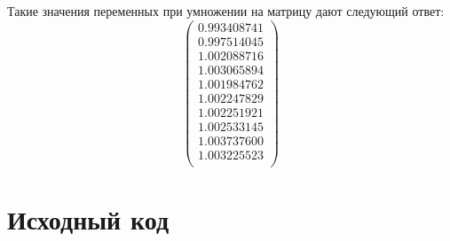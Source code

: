 \documentclass[../../report.tex]{subfiles}
\begin{document}
Такие значения переменных при умножении на матрицу дают следующий ответ:
\[
\begin{pmatrix}
    0.993408741 \\
    0.997514045 \\
    1.002088716 \\
    1.003065894 \\
    1.001984762 \\
    1.002247829 \\
    1.002251921 \\
    1.002533145 \\
    1.003737600 \\
    1.003225523 \\
\end{pmatrix}
\]

\section{Исходный код}
\end{document}
